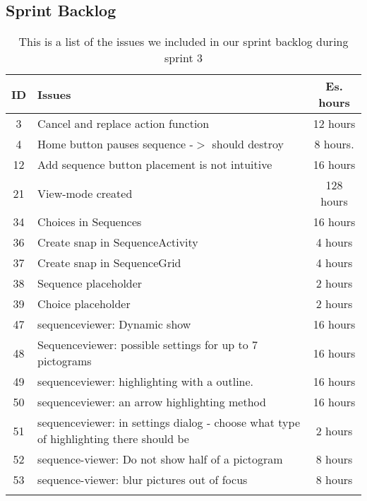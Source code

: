 \subsection{Sprint Backlog}\label{subsec:spr3_sprblog}
\begin{longtable} { | c | p{12cm} | c | } 
\hline
	ID 	&	Issues	&	Es. hours  \\\hline
	3	& 	Cancel and replace action function	&	12 hours \\\hline
	4	&	Home button pauses sequence -$>$ should destroy	&	8 hours.	\\\hline
	12	& 	Add sequence button placement is not intuitive	&	16 hours 	\\\hline
	21	& 	View-mode created				&	128 hours	\\\hline
	34	&	Choices in Sequences				& 	16 hours  \\\hline
	36	& 	Create snap in SequenceActivity		&	4 hours  \\\hline
	37	&	Create snap in SequenceGrid		& 	4 hours \\\hline
	38	& 	Sequence placeholder 			&	2 hours\\\hline
	39	&	Choice placeholder		 		&	2 hours \\\hline
	47	&	sequenceviewer: Dynamic show	 	&	16 hours \\\hline
	48	&	Sequenceviewer: possible settings for up to 7 pictograms	 & 	16 hours	\\\hline
	49	&	sequenceviewer: highlighting with a outline.	  &	16 hours \\\hline
	50	&	sequenceviewer: an arrow highlighting method	 &	16 hours \\\hline
	51	&	sequenceviewer: in settings dialog - choose what type of highlighting there should be	 &	2 hours \\\hline
	52	&	sequence-viewer: Do not show half of a pictogram	&	8 hours	\\\hline
	53	&	sequence-viewer: blur pictures out of focus		 &	8 hours \\\hline
\caption{This is a list of the issues we included in our sprint backlog during sprint 3}
\label{tab:spr3_prodblog}
\end{longtable}